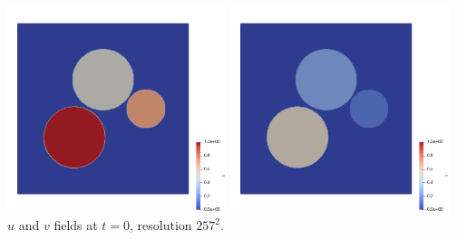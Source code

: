 \begin{center}
\includegraphics[height=6cm]{python_codes/fieldstone_171/RKtest1/u0}
\includegraphics[height=6cm]{python_codes/fieldstone_171/RKtest1/v0}\\
{\captionfont $u$ and $v$ fields at $t=0$, resolution $257^2$.}
\end{center}

